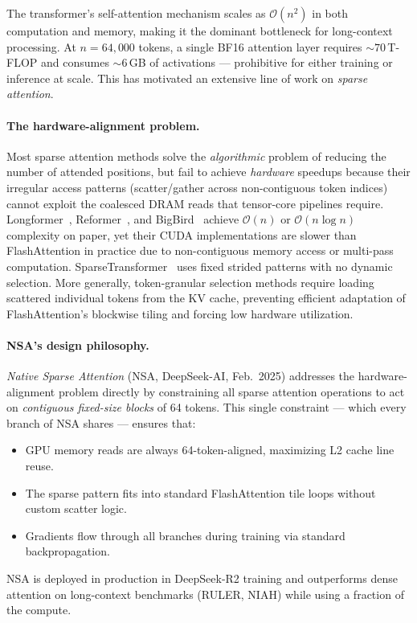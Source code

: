 \documentclass[10pt,twocolumn]{article}
\begin{document}
The transformer's self-attention mechanism scales as $\mathcal{O}(n^2)$ in both
computation and memory, making it the dominant bottleneck for long-context processing.
At $n = 64{,}000$ tokens, a single BF16 attention layer requires ${\sim}70$\,T-FLOP
and consumes ${\sim}6$\,GB of activations — prohibitive for either training or inference
at scale. This has motivated an extensive line of work on \emph{sparse attention}.

\paragraph{The hardware-alignment problem.}
Most sparse attention methods solve the \emph{algorithmic} problem of reducing
the number of attended positions, but fail to achieve \emph{hardware} speedups because
their irregular access patterns (scatter/gather across non-contiguous token indices)
cannot exploit the coalesced DRAM reads that tensor-core pipelines require.
Longformer~\cite{beltagy2020longformer}, Reformer~\cite{kitaev2020reformer}, and BigBird~\cite{zaheer2020bigbird}
achieve $\mathcal{O}(n)$ or $\mathcal{O}(n\log n)$ complexity on paper,
yet their CUDA implementations are slower than FlashAttention in practice
due to non-contiguous memory access or multi-pass computation.
SparseTransformer~\cite{child2019generating} uses fixed strided patterns with no dynamic selection.
More generally, token-granular selection methods require loading scattered individual
tokens from the KV cache, preventing efficient adaptation of FlashAttention's blockwise tiling
and forcing low hardware utilization.

\paragraph{NSA's design philosophy.}
\emph{Native Sparse Attention} (NSA, DeepSeek-AI, Feb.\ 2025) addresses the hardware-alignment
problem directly by constraining all sparse attention operations to act on \emph{contiguous
fixed-size blocks} of 64 tokens.
This single constraint — which every branch of NSA shares — ensures that:
\begin{itemize}[leftmargin=*,noitemsep,topsep=3pt]
  \item GPU memory reads are always 64-token-aligned, maximizing L2 cache line reuse.
  \item The sparse pattern fits into standard FlashAttention tile loops without custom scatter logic.
  \item Gradients flow through all branches during training via standard backpropagation.
\end{itemize}
NSA is deployed in production in DeepSeek-R2 training and outperforms dense attention
on long-context benchmarks (RULER, NIAH) while using a fraction of the compute.
\end{document}
